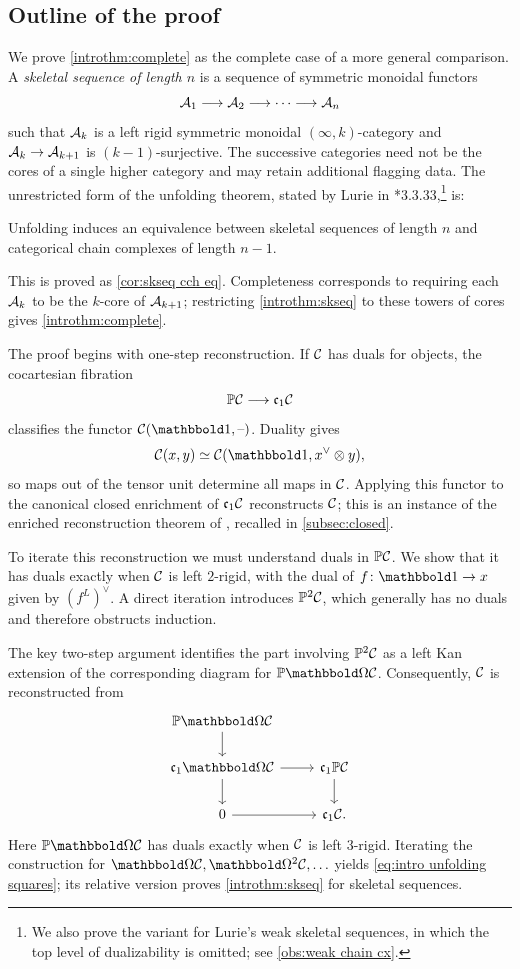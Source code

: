 \documentclass[a4paper,11pt]{article}
\begin{document}
\subsection*{Outline of the proof}

We prove \cref{introthm:complete} as the complete case of a more
general comparison.  A \emph{skeletal sequence of length $n$} is a
sequence of symmetric monoidal functors
\[
  \mathcal{A}_{1}\longrightarrow\mathcal{A}_{2}\longrightarrow\cdots
    \longrightarrow\mathcal{A}_{n}
\]
such that $\mathcal{A}_{k}$ is a left rigid symmetric monoidal
$(\infty,k)$-category and $\nA_{k}\to\nA_{k+1}$ is
$(k-1)$-surjective.  The successive categories need not be the cores
of a single higher category and may retain additional flagging data.
The unrestricted form of the unfolding theorem, stated by Lurie in
\cite{LurieCob}*{3.3.33},\footnote{We also prove the variant
  for Lurie's weak skeletal sequences, in which the top level of
  dualizability is omitted; see \cref{obs:weak chain cx}.} is:
\begin{theoremint}\label{introthm:skseq}
  Unfolding induces an equivalence between skeletal sequences of
  length $n$ and categorical chain complexes of length $n-1$.
\end{theoremint}
This is proved as \cref{cor:skseq cch eq}.
Completeness corresponds to requiring each $\mathcal{A}_{k}$ to be the
$k$-core of $\mathcal{A}_{k+1}$; restricting \cref{introthm:skseq} to these
towers of cores gives \cref{introthm:complete}.

The proof begins with one-step reconstruction.  If $\mathcal{C}$ has duals
for objects, the cocartesian fibration
\[
  \mathbb{P}\mathcal{C}\longrightarrow\mathfrak{c}_{1}\mathcal{C}
\]
classifies the functor $\nC(\bbone,\blank)$.  Duality gives
\[
  \nC(x,y)\simeq
  \nC(\bbone,x^{\vee}\otimes y),
\]
so maps out of the tensor unit determine all maps in 
$\mathcal{C}$.  Applying this functor to the canonical closed enrichment of
$\mathfrak{c}_{1}\mathcal{C}$ reconstructs $\mathcal{C}$; this is an instance of the enriched
reconstruction theorem of \cite{closed}, recalled in
\cref{subsec:closed}.

To iterate this reconstruction we must understand duals in
$\mathbb{P}\mathcal{C}$.  We show that it has duals exactly when $\mathcal{C}$ is left
$2$-rigid, with the dual of $f\colon\bbone\to x$ given by
$(f^{L})^{\vee}$.  A direct iteration introduces $\mathbb{P}^{2}\mathcal{C}$, which
generally has no duals and therefore obstructs induction.

The key two-step argument identifies the part involving
$\mathbb{P}^{2}\mathcal{C}$ as a left Kan extension of the corresponding diagram for
$\mP\mOm\nC$.  Consequently, $\mathcal{C}$ is reconstructed from
\[
  \begin{tikzcd}
    \mP\mOm\nC \ar[d] \\
    \core\mOm\nC \ar[r] \ar[d]
      & \core\mP\nC \ar[d] \\
    0 \ar[r] & \core\nC.
  \end{tikzcd}
\]
Here $\mP\mOm\nC$ has duals exactly when $\mathcal{C}$ is left $3$-rigid.
Iterating the construction for $\mOm\nC,\mOm^{2}\nC,\ldots$ yields
\cref{eq:intro unfolding squares}; its relative version proves
\cref{introthm:skseq} for skeletal sequences.
\end{document}
